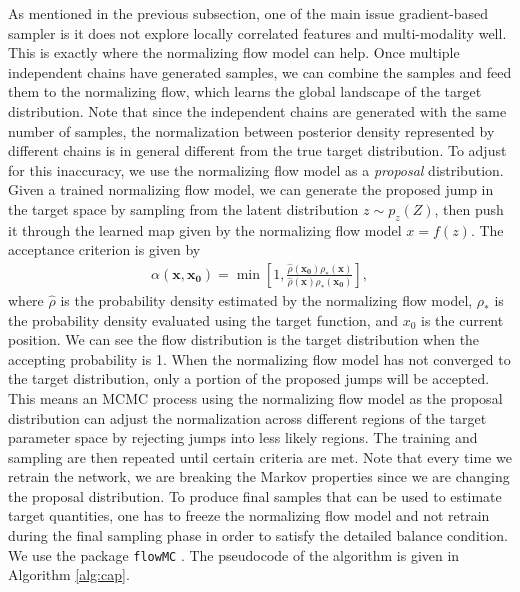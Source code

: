 \documentclass[twocolumn]{aastex631}
\begin{document}
As mentioned in the previous subsection, one of the main issue gradient-based
sampler is it does not explore locally correlated features and multi-modality well. This
is exactly where the normalizing flow model can help. Once multiple independent
chains have generated samples, we can combine the samples and feed them to the
normalizing flow, which learns the global landscape of the target
distribution. Note that since the independent chains are generated with the same
number of samples, the normalization between posterior density represented by
different chains is in general different from the true target distribution. To
adjust for this inaccuracy, we use the normalizing flow model as a
\textit{proposal} distribution. Given a trained normalizing flow model, we can
generate the proposed jump in the target space by sampling from the latent
distribution $z \sim p_z(Z)$, then push it through the learned map given by the
normalizing flow model $x=f(z)$. The acceptance criterion is given by
\begin{align}
    \alpha(\mathbf{x},\mathbf{x_0}) = \min \left[ 1, \frac{\hat{\rho}(\mathbf{x_0})\rho_*(\mathbf{x})}{\hat{\rho}(\mathbf{x})\rho_*(\mathbf{x_0})}\right],
\end{align}
where $\hat{\rho}$ is the probability density estimated by the normalizing flow
model, $\rho_*$ is the probability density evaluated using the target function,
and $x_0$ is the current position. We can see the flow distribution is the
target distribution when the accepting probability is 1. When the normalizing
flow model has not converged to the target distribution, only a portion of the
proposed jumps will be accepted. This means an MCMC process using the
normalizing flow model as the proposal distribution can adjust the normalization
across different regions of the target parameter space by rejecting jumps into
less likely regions. The training and sampling are then repeated until certain
criteria are met. Note that every time we retrain the network, we are breaking
the Markov properties since we are changing the proposal distribution. To
produce final samples that can be used to estimate target quantities, one has to
freeze the normalizing flow model and not retrain during the final sampling
phase in order to satisfy the detailed balance condition. We use the package
\texttt{flowMC} \cite{2022arXiv221106397W}. The pseudocode of the algorithm is
given in Algorithm \ref{alg:cap}.
\end{document}
